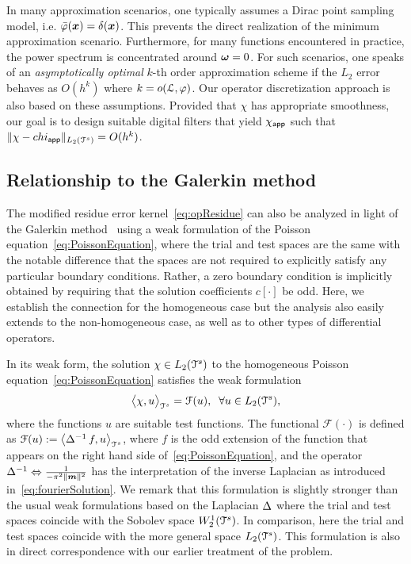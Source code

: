In many approximation scenarios, one typically assumes a Dirac point sampling
model, i.e. ${\bar{\varphi}}(\boldsymbol{x}) = \delta(\boldsymbol{x})$.
This prevents the direct realization of the minimum approximation scenario.
Furthermore, for many functions encountered in practice, the power spectrum is
concentrated around $\boldsymbol{\omega} = 0$. For such scenarios, one speaks of an
\emph{asymptotically optimal} $k$-th order approximation scheme if the $L_2$
error behaves as $O(h^k)$ where $k = o(\mathcal{L},\varphi)$. Our operator
discretization approach is also based on these assumptions. Provided that $\chi$ has appropriate smoothness, our goal is to design suitable digital filters that yield %
$\chi_{\mathsf{app}}$ such that $\lVert \chi - chi_{\mathsf{app}} \rVert_{L_2(\mathcal{T}^s)} = O(h^k)$. %

\subsection{Relationship to the Galerkin method}
\label{sec:Galerkin}
The modified residue error kernel~\eqref{eq:opResidue} can also be analyzed in light of the Galerkin method~\cite{quarteroni08} using a weak formulation of the Poisson equation~\eqref{eq:PoissonEquation}, where the trial and test spaces are the same with the notable difference that the spaces are not required to explicitly satisfy any particular boundary conditions. Rather, a zero boundary condition is implicitly obtained by requiring that the solution coefficients $c[\cdot]$ be odd. %
Here, we establish the connection for the homogeneous case but the analysis also easily extends to the non-homogeneous case, as well as to other types of differential operators.

In its weak form, the solution $\chi \in L_2(\mathcal{T}^s)$ to the homogeneous Poisson equation~\eqref{eq:PoissonEquation} satisfies the weak formulation
\begin{equation}
  \bigl \langle \chi , u \bigr \rangle_{\mathcal{T}^s} = \mathcal{F}(u), \;\; \forall u \in L_2(\mathcal{T}^s),
\end{equation}
where the functions $u$ are suitable test functions. The functional
$\mathcal{F}(\cdot)$ is defined as $\mathcal{F}(u) :=
\bigl \langle \mathop{\Delta^{-1}} f , u \bigr \rangle_{\mathcal{T}^s}$, where $f$ is the odd extension of
the function that appears on the right hand side
of~\eqref{eq:PoissonEquation}, and the operator
$\mathop{\Delta^{-1}} \Leftrightarrow \tfrac{1}{-\pi^2\lVert\boldsymbol{m}\rVert^2}$ has the
interpretation of the inverse Laplacian as introduced
in~\eqref{eq:fourierSolution}. We remark that this formulation is
slightly stronger than the usual weak formulations based on the
Laplacian $\mathop{\Delta}$ where the trial and test spaces coincide with
the Sobolev space $W_2^1(\mathcal{T}^s)$. In comparison, here the trial and
test spaces coincide with the more general space $L_2(\mathcal{T}^s)$. This
formulation is also in direct correspondence with our earlier
treatment of the problem.

